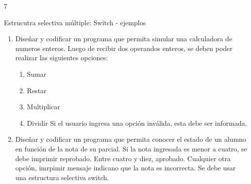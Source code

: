 7\documentclass[xcolor=pdftex,table,11pt]{beamer}
\begin{document}
\begin{frame}{Estrucutra selectiva múltiple: Switch - ejemplos}
 \begin{enumerate}
   
     	\item Diseñar y codificar un programa que permita simular una calculadora de numeros enteros.
     	Luego de recibir dos operandos enteros, se deben poder realizar las siguientes opciones:
     	 \begin{enumerate}
     	 \item Sumar
		 \item Restar
		\item Multiplicar
		\item Dividir
	   	Si el usuario ingresa una opción inválida, esta debe ser informada.
     	 \end{enumerate}

\href{https://github.com/danis963/informaticaI_IUA/blob/main/c/src/1-3_switch_case_calculadora.c}{}



     	\item Diseñar y codificar un programa que permita conocer el estado de un alumno en función de la nota de su parcial. Si la nota ingresada es menor a cuatro, se debe imprimir reprobado. Entre cuatro y diez, aprobado. Cualquier otra opción, imrpimir mensaje indicano que la nota es incorrecta. Se debe usar una estructura selectiva switch.
     	
	\href{https://github.com/danis963/informaticaI_IUA/blob/main/c/src/1-3_switch_case_notas.c}{}

   
   \end{enumerate}
   

\end{frame}
\end{document}
